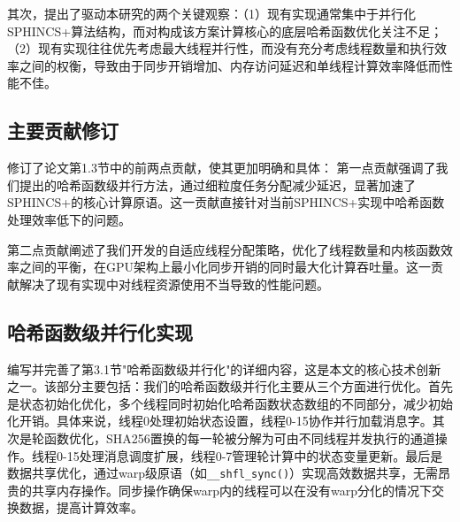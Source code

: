 \documentclass[report]{../../custom}
\begin{document}
其次，提出了驱动本研究的两个关键观察：（1）现有实现通常集中于并行化SPHINCS+算法结构，而对构成该方案计算核心的底层哈希函数优化关注不足；（2）现有实现往往优先考虑最大线程并行性，而没有充分考虑线程数量和执行效率之间的权衡，导致由于同步开销增加、内存访问延迟和单线程计算效率降低而性能不佳。

\subsection{主要贡献修订}

修订了论文第1.3节中的前两点贡献，使其更加明确和具体：
第一点贡献强调了我们提出的哈希函数级并行方法，通过细粒度任务分配减少延迟，显著加速了SPHINCS+的核心计算原语。这一贡献直接针对当前SPHINCS+实现中哈希函数处理效率低下的问题。

第二点贡献阐述了我们开发的自适应线程分配策略，优化了线程数量和内核函数效率之间的平衡，在GPU架构上最小化同步开销的同时最大化计算吞吐量。这一贡献解决了现有实现中对线程资源使用不当导致的性能问题。

\subsection{哈希函数级并行化实现}

编写并完善了第3.1节"哈希函数级并行化"的详细内容，这是本文的核心技术创新之一。该部分主要包括：我们的哈希函数级并行化主要从三个方面进行优化。首先是状态初始化优化，多个线程同时初始化哈希函数状态数组的不同部分，减少初始化开销。具体来说，线程0处理初始状态设置，线程0-15协作并行加载消息字。其次是轮函数优化，SHA256置换的每一轮被分解为可由不同线程并发执行的通道操作。线程0-15处理消息调度扩展，线程0-7管理轮计算中的状态变量更新。最后是数据共享优化，通过warp级原语（如\texttt{\_\_shfl\_sync()}）实现高效数据共享，无需昂贵的共享内存操作。同步操作确保warp内的线程可以在没有warp分化的情况下交换数据，提高计算效率。



\end{document}
